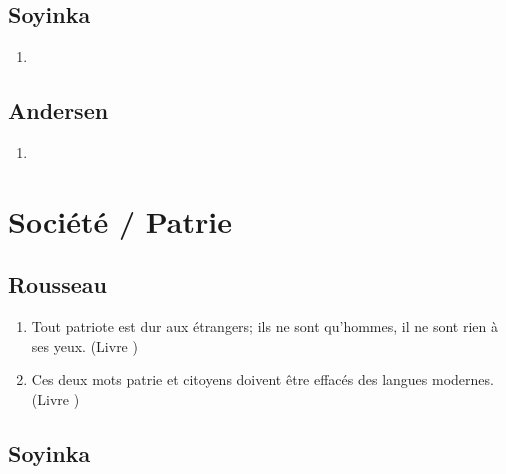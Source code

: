 \documentclass[a4paper, 11pt, hidelinks]{article}
\newcommand{\rb}[1]{\Romanbar{#1}}
\begin{document}
\subsection{Soyinka}


\begin{enumerate}
    \item 
\end{enumerate}




\subsection{Andersen}


\begin{enumerate}
    \item 
\end{enumerate}
































\section{Société / Patrie}



\subsection{Rousseau}


\begin{enumerate}
    \item Tout patriote est dur aux étrangers; ils ne sont qu'hommes, il ne sont rien à ses yeux. (Livre \rb{1})
    \item Ces deux mots patrie et citoyens doivent être effacés des langues modernes. (Livre \rb{1})
\end{enumerate}



\subsection{Soyinka}
\end{document}
